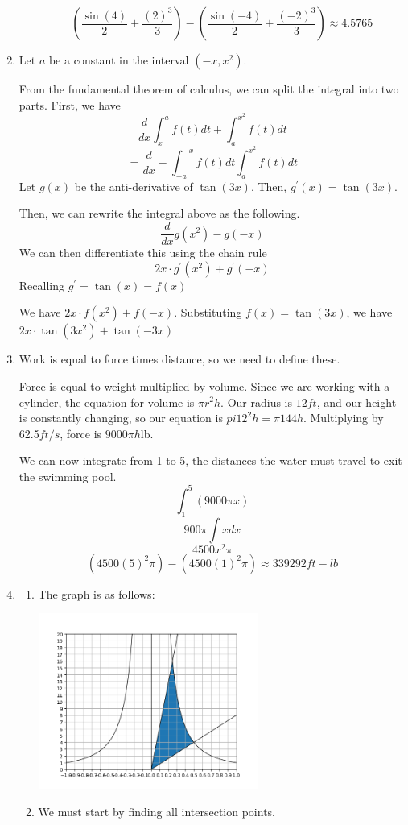 \documentclass[11pt, letterpaper, twoside]{article}
\begin{document}
\begin{enumerate}
\begin{enumerate}[label=\alph*)]
\[\left(\frac{\sin(4)}{2}+\frac{(2)^3}{3}\right)-\left(\frac{\sin(-4)}{2}+\frac{(-2)^3}{3}\right)\approx4.5765\]
\end{enumerate}

\item %
Let \(a\) be a constant in the interval \((-x, x^2)\).

From the fundamental theorem of calculus, we can split the integral into two parts. 
First, we have 
\[\frac{d}{dx}\int_x^a f(t)dt+\int_a^{x^2}f(t)dt\]
\[=\frac{d}{dx}-\int_{-a}^{-x}f(t)dt\int_a^{x^2}f(t)dt\]
Let \(g(x)\) be the anti-derivative of \(\tan(3x)\). Then, \(g^\prime(x)=\tan(3x)\).

Then, we can rewrite the integral above as the following.
\[\frac{d}{dx}g(x^2)-g(-x)\]
We can then differentiate this using the chain rule
\[2x\cdot g^\prime(x^2)+g^\prime (-x)\]
Recalling \(g^\prime=\tan (x) = f(x)\)

We have \(2x\cdot f(x^2)+f(-x)\). 
Substituting \(f(x)=\tan(3x)\), we have \(\boxed{2x\cdot\tan(3x^2)+\tan(-3x)}\)

\item %
Work is equal to force times distance, so we need to define these.

Force is equal to weight multiplied by volume.
Since we are working with a cylinder, the equation for volume is \(\pi r^2h\).
Our radius is \(12ft\), and our height is constantly changing, so our equation is \(pi 12^2h=\pi 144h\).
Multiplying by 62.5\(ft/s\), force is \(9000\pi h\)lb.

We can now integrate from 1 to 5, the distances the water must travel to exit the swimming pool.
\[\int_1^5(9000\pi x)\]
\[900\pi\int xdx\]
\[4500x^2\pi\]
\[(4500(5)^2\pi)-(4500(1)^2\pi)\approx\boxed{339292 ft-lb}\]
\item %
\begin{enumerate}[label=\alph*)]
\item The graph is as follows:

\includegraphics[width=0.6\textwidth]{q5}\par\vspace{1cm}
\item %
We must start by finding all intersection points.


\end{enumerate}
\end{enumerate}
\end{document}
